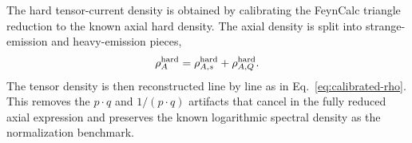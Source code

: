\documentclass[aps,prd,a4paper,preprint,preprintnumbers,titlepage,
nofootinbib,superscriptaddress]{revtex4-2}
\begin{document}
The hard tensor-current density is obtained by calibrating the FeynCalc
triangle reduction to the known axial hard density.  The axial density is
split into strange-emission and heavy-emission pieces,
\[
  \rho_A^{\rm hard}=\rho_{A,s}^{\rm hard}+\rho_{A,Q}^{\rm hard}.
\]
The tensor density is then reconstructed line by line as in
Eq.~\eqref{eq:calibrated-rho}.  This removes the \(p\cdot q\) and
\(1/(p\cdot q)\) artifacts that cancel in the fully reduced axial expression
and preserves the known logarithmic spectral density as the normalization
benchmark.



\end{document}
